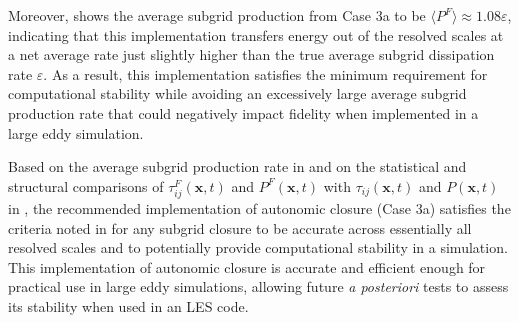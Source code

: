Moreover,  shows the average subgrid production from Case 3a to be $\langle P^F \rangle \approx 1.08 \varepsilon$, indicating that this implementation transfers energy out of the resolved scales at a net average rate just slightly higher than the true average subgrid dissipation rate $\varepsilon$. As a result, this implementation satisfies the minimum requirement for computational stability while avoiding an excessively large average subgrid production rate that could negatively impact fidelity when implemented in a large eddy simulation.

Based on the average subgrid production rate in  and on the statistical and structural comparisons of  $\tau_{ij}^{F}(\mathbf{x},t)$ and $P^{F}(\mathbf{x},t)$  with  $\tau_{ij}(\mathbf{x},t)$ and  $P(\mathbf{x},t)$ in , the recommended implementation of autonomic closure (Case 3a) satisfies the criteria noted in  for any subgrid closure to be accurate across essentially all resolved scales and to potentially provide computational stability in a simulation. This implementation of autonomic closure is accurate and efficient enough for practical use in large eddy simulations, allowing future \textit{a posteriori} tests to assess its stability when used in an LES code.





% 

